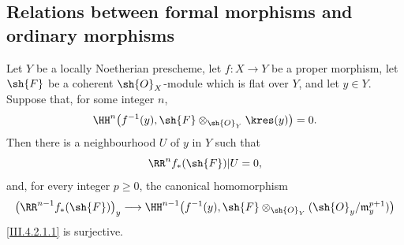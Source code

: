 \subsection{Relations between formal morphisms and ordinary morphisms}
\label{subsection:III.4.6}

\begin{proposition}[4.6.1]
\label{III.4.6.1}
Let $Y$ be a locally Noetherian prescheme, let $f:X\to Y$ be a
proper morphism, let $\sh{F}$ be a coherent $\sh{O}_X$-module which
is flat over $Y$, and let $y\in Y$.  Suppose that, for some integer
$n$,
\[
  \HH^n\bigl(f^{-1}(y),
    \sh{F}\otimes_{\sh{O}_Y}\kres(y)\bigr)=0.
\]
Then there is a neighbourhood $U$ of $y$ in $Y$ such that
\[
  \RR^n f_*(\sh{F})|U=0,
\]
and, for every integer $p\geq0$, the canonical homomorphism
\[
  \bigl(\RR^{n-1}f_*(\sh{F})\bigr)_y
  \longrightarrow
  \HH^{n-1}\bigl(f^{-1}(y),
    \sh{F}\otimes_{\sh{O}_Y}
      (\sh{O}_y/\mathfrak m_y^{p+1})\bigr)
\]
\eqref{III.4.2.1.1} is surjective.
\end{proposition}

